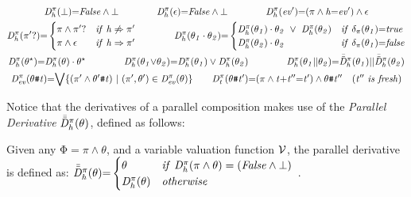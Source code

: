 \documentclass[acmsmall,10pt,review]{acmart}
\newcommand{\env}{\code{\mathcal{V}}}
\newcommand{\es}{\theta}
\newcommand{\ev}{ev}
\newcommand{\effect}{{\ensuremath{\mathrm{\Phi}}}}
\newcommand{\code}[1]{{\tt{\ensuremath{\m{#1}}}}}
\newcommand{\m}{\mathit}
\newcommand{\mysharp}{{\mathrel{\texttt{\#}}}}
\begin{document}
{\begin{definition}
  \begin{gather*}
  \code{D^{\pi}_{h}( \bot ) {=}}  \code{False \wedge \bot } 
  \qquad\qquad 
  \code{D^{\pi}_{h}(   \epsilon) {=}}  \code{False \wedge \bot } 
  \qquad\qquad
  \code{D^{\pi}_{h}(  \ev^\prime) } {=} 
  \code{  (\pi \wedge h{=}\ev^\prime) \wedge \epsilon} 
  \\
  {
   \code{\code{D^{\pi}_{h}( \pi^\prime?)} {=}}
  \begin{cases}
        \code{\pi \wedge \pi^\prime? } &\code{if\ h \not\Rightarrow  \pi^\prime}   \\
        \code{\pi \wedge \epsilon} & \code{if\ h \Rightarrow \pi^\prime} 
      \end{cases} 
      }
      \qquad \quad \ \ \ 
  {
   \code{D^{\pi}_{h}( \es_1  \cdot  \es_2) {=} }
  \begin{cases}
        \code{D^{\pi}_{h}( \es_1) \cdot  \es_2\ \vee \  D^{\pi}_{h}( \es_2)}  &\code{if\ \delta_{\pi}(\es_1) {=} true}   \\
        \code{D^{\pi}_{h}( \es_2) \cdot  \es_2} & \code{if\ \delta_{\pi}(\es_1) {=} false} 
      \end{cases} 
      }
  \\
  \code{D^{\pi}_{h}(  {\es^\star}) } {=} \code{ D^{\pi}_{h}(  {\es}) \cdot {\es^\star}}  
  \qquad\quad \ \ \ 
  \code{D^{\pi}_{h}(  \es_1 {\vee} \es_2) } {=} \code{ D^{\pi}_{h}(  \es_1) \vee D^{\pi}_{h}(  \es_2)} 
  \qquad \quad\ \ \ 
  \code{D^{\pi}_{h}( \es_1 {||}\es_2)} {=} \code{\Bar{\Bar{D}}^{\pi}_{h}( \es_1)} || \code{\Bar{\Bar{D}}^{\pi}_{h}( \es_2)} 
   \\
   \code{D^{\pi}_{\ev}(  \es \mysharp t) } {=} {\bigvee}
   \code{ \{ (\pi^\prime \wedge \es^\prime  \mysharp t) \ | \ (\pi^\prime, \es^\prime) \in D^{\pi}_{\ev}(\es) \} } 
\qquad 
   \code{D^{\pi}_{t}(  \es \mysharp t^\prime) } {=} 
   \code{ (\pi \wedge t{+}t^{\prime\prime}{=}t^\prime) \wedge  
   \es \mysharp t^{\prime\prime} \ \ \  {(t^{\prime\prime}\ is\ fresh)} } 
  \end{gather*}
  \end{definition}
  
Notice that the derivatives of a parallel composition makes use of the \emph{Parallel Derivative} \code{\Bar{\Bar{D}}^{\pi}_{h}(\es)}, defined as follows: 
 
\begin{definition}\label{Derivative_maybe}
    Given any \code{\effect {=} \pi \wedge \es}, and a variable valuation function \code{\env}, 
    the parallel derivative is defined as: {
      \code{\Bar{\Bar{D}}^{\pi}_{h}( \es) {=}
      \begin{cases}
            \code{ \es} & \code{if\ D^{\pi}_{h}(\pi \wedge \es) = (False \wedge \bot )}\\
            \code{D^{\pi}_{h}( \es)} & \code{otherwise}
          \end{cases} }
    }.
  \end{definition}


}
\end{document}
